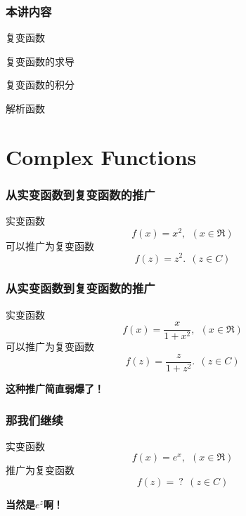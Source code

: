 \documentclass[CJK]{beamer}
\date{}
\begin{document}
\bch  
{}




\begin{frame}
\frametitle{本讲内容}
\bitem
\item{复变函数}
\item{复变函数的求导}
\item{复变函数的积分}
\item{解析函数}
\eitem

\end{frame}


\section{Complex Functions}


\begin{frame}
  \frametitle{从实变函数到复变函数的推广}

  \bex
  实变函数
  $$f(x) = x^2, \ \ (x\in \Re)$$
  可以推广为复变函数
  $$f(z) = z^2. \ \ (z\in C) $$
  \eex

  
\end{frame}


\begin{frame}
  \frametitle{从实变函数到复变函数的推广}
  
  

  \bex
  实变函数
  $$f(x) = \frac{x}{1+x^2},\ \ (x\in \Re)$$
  可以推广为复变函数
  $$f(z) = \frac{z}{1+z^2}. \ \ (z\in C)$$
  \eex

  
\end{frame}



\begin{frame}
  

  \bcenter
      {\bf \Large 这种推广简直弱爆了！}

      \ecenter
  
\end{frame}


\begin{frame}
  \frametitle{那我们继续}
  
  实变函数
  $$f(x) = e^x,\ \ (x\in \Re)$$
  推广为复变函数
  $$f(z) = \ ? \ \ (z\in C)$$
  
\end{frame}

\begin{frame}
  
  \bcenter
  {\bf \Large 当然是$e^z$啊！}
  \ecenter
  
\end{frame}
\end{document}
